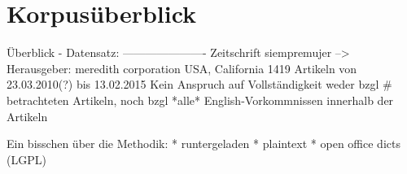 \section{Korpusüberblick}

Überblick - Datensatz:
----------------------
Zeitschrift siempremujer --> Herausgeber: meredith corporation USA, California
1419 Artikeln von 23.03.2010(?) bis 13.02.2015
Kein Anspruch auf Vollständigkeit weder bzgl # betrachteten Artikeln, noch bzgl *alle* English-Vorkommnissen innerhalb der Artikeln

Ein bisschen über die Methodik:
* runtergeladen
* plaintext
* open office dicts (LGPL)
